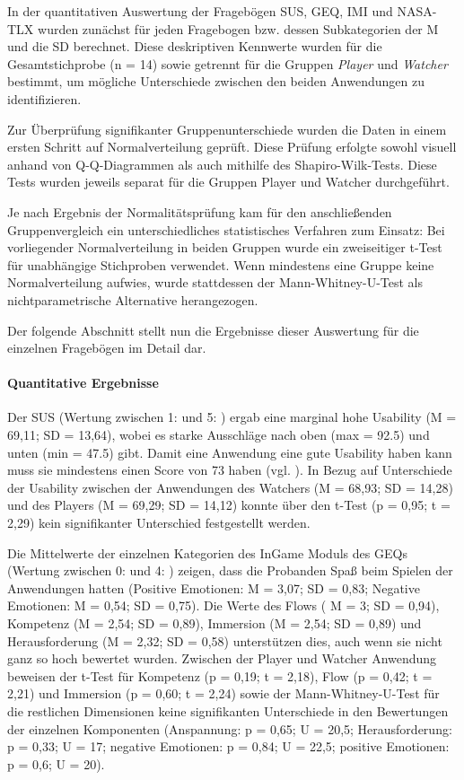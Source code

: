 In der quantitativen Auswertung der Fragebögen \ac{SUS}, \ac{GEQ}, \ac{IMI} und \ac{NASA-TLX} wurden zunächst für jeden Fragebogen bzw. dessen Subkategorien der \ac{M} und die \ac{SD} berechnet. Diese deskriptiven Kennwerte wurden für die Gesamtstichprobe (n = 14) sowie getrennt für die Gruppen \textit{Player} und \textit{Watcher} bestimmt, um mögliche Unterschiede zwischen den beiden Anwendungen zu identifizieren.

Zur Überprüfung signifikanter Gruppenunterschiede wurden die Daten in einem ersten Schritt auf Normalverteilung geprüft. Diese Prüfung erfolgte sowohl visuell anhand von \ac{Q-Q}-Diagrammen als auch mithilfe des Shapiro-Wilk-Tests. Diese Tests wurden jeweils separat für die Gruppen Player und Watcher durchgeführt. 

Je nach Ergebnis der Normalitätsprüfung kam für den anschließenden Gruppenvergleich ein unterschiedliches statistisches Verfahren zum Einsatz: Bei vorliegender Normalverteilung in beiden Gruppen wurde ein zweiseitiger t-Test für unabhängige Stichproben verwendet. Wenn mindestens eine Gruppe keine Normalverteilung aufwies, wurde stattdessen der Mann-Whitney-U-Test als nichtparametrische Alternative herangezogen.

Der folgende Abschnitt stellt nun die Ergebnisse dieser Auswertung für die einzelnen Fragebögen im Detail dar.
\paragraph{Quantitative Ergebnisse}
Der \ac{SUS} (Wertung zwischen 1:  und 5: ) ergab eine marginal hohe Usability (M = 69,11; SD = 13,64), wobei es starke Ausschläge nach oben (max = 92.5) und unten (min = 47.5) gibt. Damit eine Anwendung eine gute Usability haben kann muss sie mindestens einen Score von 73 haben (vgl. \cite[S. 36]{brooke_sus_2013}). In Bezug auf Unterschiede der Usability zwischen der Anwendungen des Watchers (M = 68,93; SD = 14,28) und des Players (M = 69,29; SD = 14,12) konnte über den t-Test (p = 0,95; t = 2,29) kein signifikanter Unterschied festgestellt werden.

Die Mittelwerte der einzelnen Kategorien des InGame Moduls des \ac{GEQ}s (Wertung zwischen 0:  und 4: ) zeigen, dass die Probanden Spaß beim Spielen der Anwendungen hatten (Positive Emotionen: M = 3,07; SD = 0,83; Negative Emotionen: M = 0,54; SD = 0,75). Die Werte des Flows ( M = 3; SD = 0,94), Kompetenz (M = 2,54; SD = 0,89), Immersion (M = 2,54; SD = 0,89) und Herausforderung (M = 2,32; SD = 0,58) unterstützen dies, auch wenn sie nicht ganz so hoch bewertet wurden. Zwischen der Player und Watcher Anwendung beweisen der t-Test für Kompetenz (p = 0,19; t = 2,18), Flow (p = 0,42; t = 2,21) und Immersion (p = 0,60; t = 2,24) sowie der Mann-Whitney-U-Test für die restlichen Dimensionen keine signifikanten Unterschiede in den Bewertungen der einzelnen Komponenten (Anspannung: p = 0,65; U = 20,5; Herausforderung: p = 0,33; U = 17; negative Emotionen: p = 0,84; U = 22,5; positive Emotionen: p = 0,6; U = 20).

